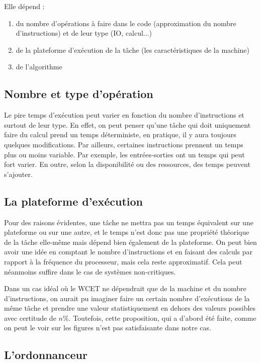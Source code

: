 	Elle dépend :
	\begin{enumerate}
		\item du nombre d'opérations à faire dans le code (approximation du nombre d'instructions) et de leur type (IO, calcul...)
		\item de la plateforme d'exécution de la tâche (les caractéristiques de la machine)
		\item de l'algorithme 
	\end{enumerate}
	
	\subsection{Nombre et type d'opération}
	Le pire temps d'exécution peut varier en fonction du nombre d'instructions et surtout de leur type. En effet, 
	on peut penser qu'une tâche qui doit uniquement faire du calcul prend un temps déterministe, en pratique, 
	il y aura toujours quelques modifications. \newline
	Par ailleurs, certaines instructions prennent un temps plus ou moins variable. Par exemple, 
	les entrées-sorties ont un temps qui peut fort varier. En outre, selon la disponibilité ou 
	des ressources, des temps peuvent s'ajouter. 
	
	\subsection{La plateforme d'exécution}
	Pour des raisons évidentes, une tâche ne mettra pas un temps équivalent sur une plateforme ou sur une autre, 
	et le temps n'est donc pas une propriété théorique de la tâche elle-même mais dépend bien 
	également de la plateforme. On peut bien avoir une idée en comptant le nombre d'instructions et en faisant 
	des calculs par rapport à la fréquence du processeur, mais cela reste approximatif. 
	Cela peut néanmoins suffire dans le cas de systèmes non-critiques.\newline
	
	Dans un cas idéal où le WCET ne dépendrait que de la machine et du nombre d'instructions, 
	on aurait pu imaginer faire un certain nombre d'exécutions de la même tâche et prendre une valeur 
	statistiquement en dehors des valeurs possibles avec certitude de $n\%$. %
	Toutefois, cette proposition, qui a d'abord été faite, comme on peut le voir sur les figures 
	n'est pas satisfaisante dans notre cas.

	\subsection{L'ordonnanceur}
	
